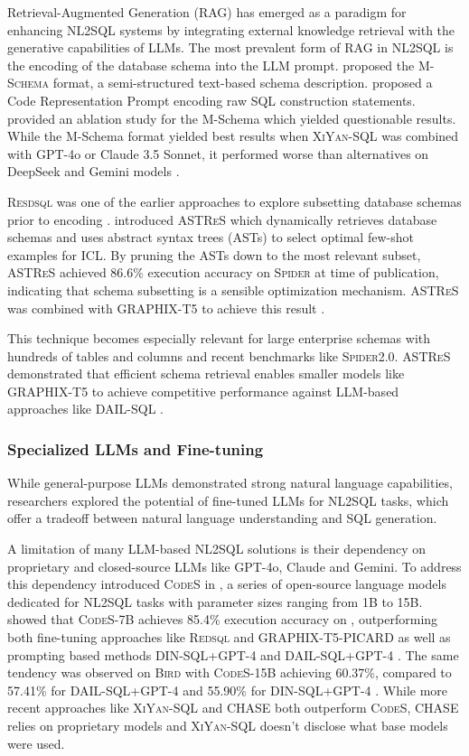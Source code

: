 Retrieval-Augmented Generation (RAG) has emerged as a paradigm for enhancing
NL2SQL systems by integrating external knowledge retrieval with the generative
capabilities of LLMs. The most prevalent form of RAG in NL2SQL is the encoding
of the database schema into the LLM prompt. \cite{XiYan} proposed the
\textsc{M-Schema} format, a semi-structured text-based schema description.
\cite{DAIL-SQL} proposed a Code Representation Prompt encoding raw SQL
construction statements. \cite{XiYan} provided an ablation study for the
M-Schema which yielded questionable results. While the M-Schema format yielded
best results when \textsc{XiYan-SQL} was combined with GPT-4o or Claude 3.5
Sonnet, it performed worse than alternatives on DeepSeek and Gemini models
\citep{XiYan}.

\textsc{Resdsql} was one of the earlier approaches to explore subsetting
database schemas prior to encoding \citep{RESDSQL}. \cite{RetAug} introduced
\textsc{ASTReS} which dynamically retrieves database schemas and uses abstract
syntax trees (ASTs) to select optimal few-shot examples for ICL. By pruning the
ASTs down to the most relevant subset, \textsc{ASTReS} achieved 86.6\%
execution accuracy on \textsc{Spider} at time of publication, indicating that
schema subsetting is a sensible optimization mechanism. \textsc{ASTReS} was
combined with GRAPHIX-T5 to achieve this result \citep{RetAug}.

This technique becomes especially relevant for large enterprise schemas with
hundreds of tables and columns and recent benchmarks like \textsc{Spider2.0}.
\textsc{ASTReS} demonstrated that efficient schema retrieval enables smaller
models like GRAPHIX-T5 to achieve competitive performance against LLM-based
approaches like DAIL-SQL \citep{DAIL-SQL, RetAug}.

\subsubsection{Specialized LLMs and Fine-tuning}

While general-purpose LLMs demonstrated strong natural language capabilities,
researchers explored the potential of fine-tuned LLMs for NL2SQL tasks, which offer a
tradeoff between natural language understanding and SQL generation.

A limitation of many LLM-based NL2SQL solutions is their dependency on
proprietary and closed-source LLMs like GPT-4o, Claude and Gemini. To address
this dependency \cite{CodeS} introduced \textsc{CodeS} in \citeyear{CodeS}, a
series of open-source language models dedicated for NL2SQL tasks with parameter
sizes ranging from 1B to 15B. \cite{CodeS} showed that \textsc{CodeS}-7B
achieves 85.4\% execution accuracy on \Spider, outperforming both
fine-tuning approaches like \textsc{Redsql} and GRAPHIX-T5-PICARD as well as
prompting based methods DIN-SQL+GPT-4 and DAIL-SQL+GPT-4 \citep{CodeS}. The
same tendency was observed on \textsc{Bird} with \textsc{CodeS}-15B achieving
60.37\%, compared to 57.41\% for DAIL-SQL+GPT-4 and 55.90\% for DIN-SQL+GPT-4
\citep{CodeS}. While more recent approaches like \textsc{XiYan-SQL} and CHASE
both outperform \textsc{CodeS}, CHASE relies on proprietary models and
\textsc{XiYan-SQL} doesn't disclose what base models were used.


